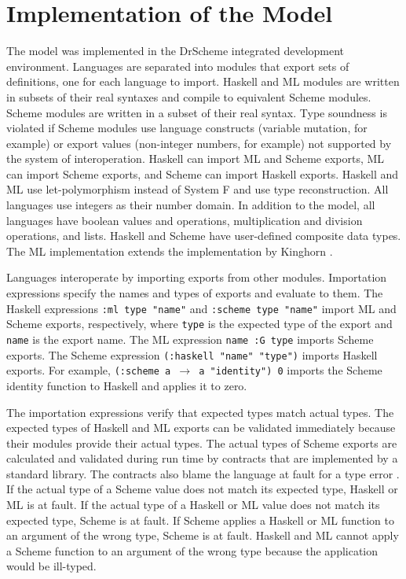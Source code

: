 \chapter{Implementation of the Model}

The model was implemented in the DrScheme integrated development environment.  Languages are separated into modules that export sets of definitions, one for each language to import.  Haskell and ML modules are written in subsets of their real syntaxes and compile to equivalent Scheme modules.  Scheme modules are written in a subset of their real syntax.  Type soundness is violated if Scheme modules use language constructs (variable mutation, for example) or export values (non-integer numbers, for example) not supported by the system of interoperation.  Haskell can import ML and Scheme exports, ML can import Scheme exports, and Scheme can import Haskell exports.  Haskell and ML use let-polymorphism instead of System F and use type reconstruction.  All languages use integers as their number domain.  In addition to the model, all languages have boolean values and operations, multiplication and division operations, and lists.  Haskell and Scheme have user-defined composite data types.  The ML implementation extends the implementation by Kinghorn \cite{kinghorn07}.

Languages interoperate by importing exports from other modules.  Importation expressions specify the names and types of exports and evaluate to them.  The Haskell expressions \texttt{:ml type "name"} and \texttt{:scheme type "name"} import ML and Scheme exports, respectively, where \texttt{type} is the expected type of the export and \texttt{name} is the export name.  The ML expression \texttt{name :G type} imports Scheme exports.  The Scheme expression \texttt{(:haskell "name" "type")} imports Haskell exports.  For example, \texttt{(:scheme a $\rightarrow$ a "identity") 0} imports the Scheme identity function to Haskell and applies it to zero.

The importation expressions verify that expected types match actual types.  The expected types of Haskell and ML exports can be validated immediately because their modules provide their actual types.  The actual types of Scheme exports are calculated and validated during run time by contracts \cite{findler02} that are implemented by a standard library.  The contracts also blame the language at fault for a type error \cite{findler02}.  If the actual type of a Scheme value does not match its expected type, Haskell or ML is at fault.  If the actual type of a Haskell or ML value does not match its expected type, Scheme is at fault.  If Scheme applies a Haskell or ML function to an argument of the wrong type, Scheme is at fault.  Haskell and ML cannot apply a Scheme function to an argument of the wrong type because the application would be ill-typed.